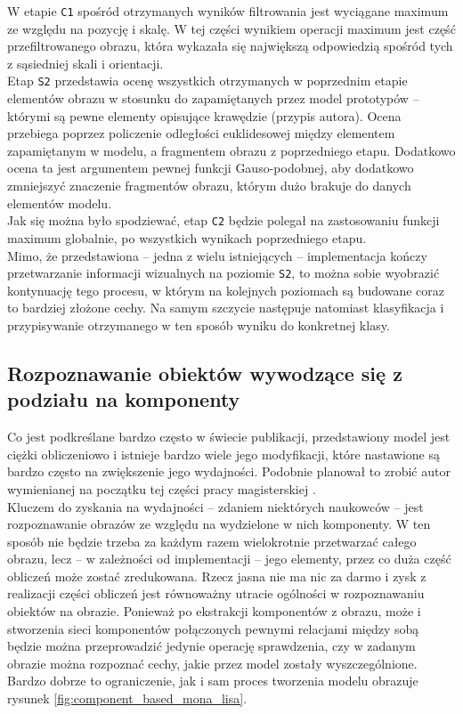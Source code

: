 W etapie \texttt{C1} spośród otrzymanych wyników filtrowania jest wyciągane maximum ze względu na pozycję i skalę. W tej części wynikiem operacji maximum jest część przefiltrowanego obrazu, która wykazała się największą odpowiedzią spośród tych z sąsiedniej skali i orientacji.\\

Etap \texttt{S2} przedstawia ocenę wszystkich otrzymanych w poprzednim etapie elementów obrazu w stosunku do zapamiętanych przez model prototypów -- którymi są pewne elementy opisujące krawędzie (przypis autora). Ocena przebiega poprzez policzenie odległości euklidesowej między elementem zapamiętanym w modelu, a fragmentem obrazu z poprzedniego etapu. Dodatkowo ocena ta jest argumentem pewnej funkcji Gauso-podobnej, aby dodatkowo zmniejszyć znaczenie fragmentów obrazu, którym dużo brakuje do danych elementów modelu.\\

Jak się można było spodziewać, etap \texttt{C2} będzie polegał na zastosowaniu funkcji maximum globalnie, po wszystkich wynikach poprzedniego etapu.\\

Mimo, że przedstawiona -- jedna z wielu istniejących -- implementacja kończy przetwarzanie informacji wizualnych na poziomie \texttt{S2}, to można sobie wyobrazić kontynuację tego procesu, w którym na kolejnych poziomach są budowane coraz to bardziej złożone cechy. Na samym szczycie następuje natomiast klasyfikacja i przypisywanie otrzymanego w ten sposób wyniku do konkretnej klasy.

\subsection{Rozpoznawanie obiektów wywodzące się z podziału na komponenty}
\label{componentBasedObjectRecognition}
 
Co jest podkreślane bardzo często w świecie publikacji, przedstawiony model jest ciężki obliczeniowo i istnieje bardzo wiele jego modyfikacji, które nastawione są bardzo często na zwiększenie jego wydajności. Podobnie planował to zrobić autor wymienianej na początku tej części pracy magisterskiej \cite{Lopez2008}.\\

Kluczem do zyskania na wydajności -- zdaniem niektórych naukowców -- jest rozpoznawanie obrazów ze względu na wydzielone w nich komponenty. W ten sposób nie będzie trzeba za każdym razem wielokrotnie przetwarzać całego obrazu, lecz -- w zależności od implementacji -- jego elementy, przez co duża część obliczeń może zostać zredukowana. Rzecz jasna nie ma nic za darmo i zysk z realizacji części obliczeń jest równoważny utracie ogólności w rozpoznawaniu obiektów na obrazie. Ponieważ po ekstrakcji komponentów z obrazu, może i stworzenia sieci komponentów połączonych pewnymi relacjami między sobą będzie można przeprowadzić jedynie operację sprawdzenia, czy w zadanym obrazie można rozpoznać cechy, jakie przez model zostały wyszczególnione. Bardzo dobrze to ograniczenie, jak i sam proces tworzenia modelu obrazuje rysunek \ref{fig:component_based_mona_lisa}.\\

